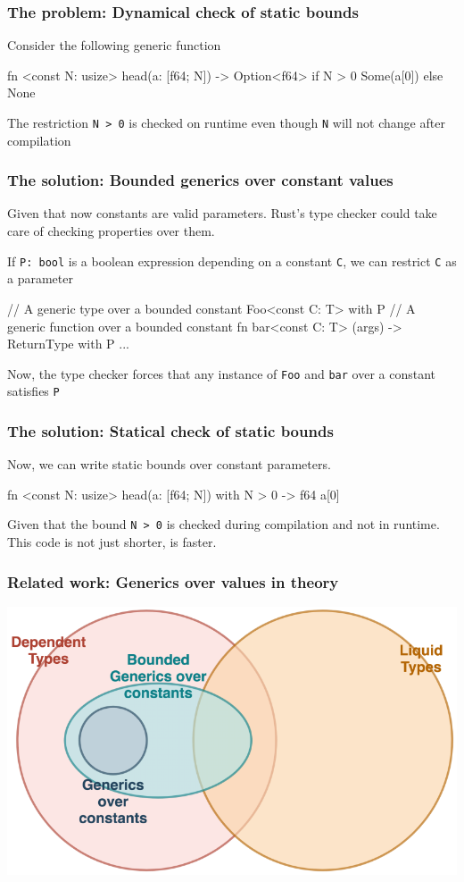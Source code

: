 \documentclass{beamer}
\newcommand{\code}[1] {\texttt{\footnotesize #1}}
\begin{document}
\begin{frame}[fragile]
    \frametitle{The problem: Dynamical check of static bounds}
    Consider the following generic function
    \begin{rustcode}
        fn <const N: usize> head(a: [f64; N]) -> Option<f64> {
            if N > 0 {
                Some(a[0])
            } else {
                None
            }
        }
    \end{rustcode}
    The restriction \code{N > 0} is checked on runtime even though \code{N} will not change after compilation
\end{frame}

\begin{frame}[fragile]
    \frametitle{The solution: Bounded generics over constant values}
    Given that now constants are valid parameters. Rust's type checker could take care of checking properties over them.

    If \code{P: bool} is a boolean expression depending on a constant \code{C}, we can restrict \code{C} as a parameter
    \begin{rustcode}
        // A generic type over a bounded constant
        Foo<const C: T> with P
        // A generic function over a bounded constant
        fn bar<const C: T> (args) -> ReturnType with P { ... }
    \end{rustcode}

    Now, the type checker forces that any instance of \code{Foo} and \code{bar} over a constant satisfies \code{P}
    
\end{frame}

\begin{frame}[fragile]
    \frametitle{The solution: Statical check of static bounds}
    Now, we can write static bounds over constant parameters.
    \begin{rustcode}
        fn <const N: usize> head(a: [f64; N]) with {N > 0} -> f64 {
            a[0]
        }
    \end{rustcode}
    Given that the bound \code{N > 0} is checked during compilation and not in runtime. This code is not just shorter, is faster.
\end{frame}

\begin{frame}[fragile]
    \frametitle{Related work: Generics over values in theory}
    \includegraphics[width=\textwidth]{./theory.png}
\end{frame}
\end{document}
